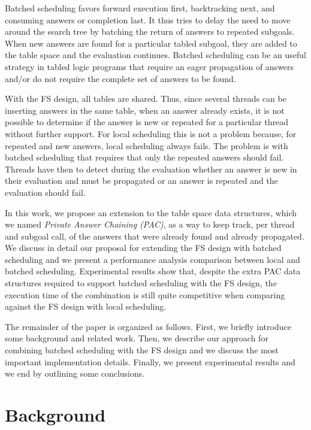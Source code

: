 \documentclass{llncs}
\begin{document}
Batched scheduling favors forward execution first, backtracking next,
and consuming answers or completion last. It thus tries to delay the
need to move around the search tree by batching the return of answers
to repeated subgoals. When new answers are found for a particular
tabled subgoal, they are added to the table space and the evaluation
continues. Batched scheduling can be an useful strategy in tabled
logic programs that require an eager propagation of answers and/or do
not require the complete set of answers to be found.

With the FS design, all tables are shared. Thus, since several threads
can be inserting answers in the same table, when an answer already
exists, it is not possible to determine if the answer is new or
repeated for a particular thread without further support. For local
scheduling this is not a problem because, for repeated and new
answers, local scheduling always fails. The problem is with batched
scheduling that requires that only the repeated answers should
fail. Threads have then to detect during the evaluation whether an
answer is new in their evaluation and must be propagated or an answer
is repeated and the evaluation should fail.
 
In this work, we propose an extension to the table space data
structures, which we named \emph{Private Answer Chaining (PAC)}, as a
way to keep track, per thread and subgoal call, of the answers that
were already found and already propagated. We discuss in detail our
proposal for extending the FS design with batched scheduling and we
present a performance analysis comparison between local and batched
scheduling. Experimental results show that, despite the extra PAC data
structures required to support batched scheduling with the FS design,
the execution time of the combination is still quite competitive when
comparing against the FS design with local scheduling. 

The remainder of the paper is organized as follows. First, we briefly
introduce some background and related work. Then, we describe our
approach for combining batched scheduling with the FS design and we
discuss the most important implementation details. Finally, we present
experimental results and we end by outlining some conclusions.


\section{Background}
\end{document}
